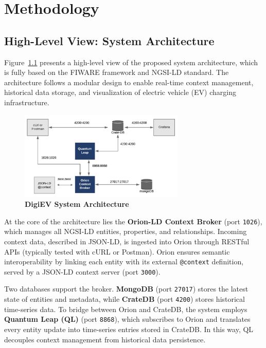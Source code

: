 \chapter{Methodology}\label{chap4}

\section{High-Level View: System Architecture}

Figure~\ref{fig:architecture} presents a high-level view of the
proposed system architecture, which is fully based on the FIWARE
framework and NGSI-LD standard. The architecture follows a modular
design to enable real-time context management, historical data storage,
and visualization of electric vehicle (EV) charging infrastructure.

\begin{figure}[ht!]
    \centering
    \includegraphics[width=0.7\textwidth]{Images/digiev-architecture.png}
    \caption{\textbf{DigiEV System Architecture}}
    \label{fig:architecture}
\end{figure}

At the core of the architecture lies the \textbf{Orion-LD Context Broker}
(port \texttt{1026}), which manages all NGSI-LD entities, properties,
and relationships. Incoming context data, described in JSON-LD, is
ingested into Orion through RESTful APIs (typically tested with cURL
or Postman). Orion ensures semantic interoperability by linking each
entity with its external \texttt{@context} definition, served by a JSON-LD
context server (port \texttt{3000}).

Two databases support the broker. \textbf{MongoDB} (port
\texttt{27017}) stores the latest state of entities and metadata, while
\textbf{CrateDB} (port \texttt{4200}) stores historical time-series data.
To bridge between Orion and CrateDB, the system employs
\textbf{Quantum Leap (QL)} (port \texttt{8868}), which subscribes to
Orion and translates every entity update into time-series entries stored
in CrateDB. In this way, QL decouples context management from
historical data persistence.

